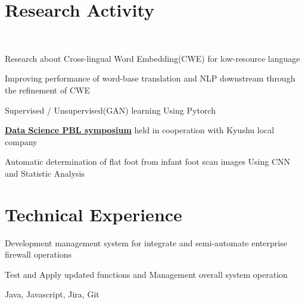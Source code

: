 \documentclass[]{deedy-resume-openfont}
\begin{document}
\hfill
\begin{minipage}[t]{0.55\textwidth} 


\section{Research Activity}
\\
\vspace{\topsep} %
\begin{tightemize}
\item Research about Cross-lingual Word Embedding(CWE) for low-resource language
\item Improving performance of word-base translation and NLP downstream through the refinement of CWE
\item Supervised / Unsupervised(GAN) learning Using Pytorch
\end{tightemize}
\sectionsep


\begin{tightemize}
\item \textbf{\href{https://ads.i.kyushu-u.ac.jp/archives/1642}{Data Science PBL symposium}} held in cooperation with Kyushu local company
\item Automatic determination of flat foot from infant foot scan images Using CNN and Statistic Analysis
\end{tightemize}
\sectionsep




\section{Technical Experience}
\sectionsep

\begin{tightemize}
\item Development management system for integrate and semi-automate enterprise firewall operations
\item Test and Apply updated functions and Management overall system operation
\item Java, Javascript, Jira, Git
\end{tightemize}
\sectionsep


\end{minipage}
\end{document}

